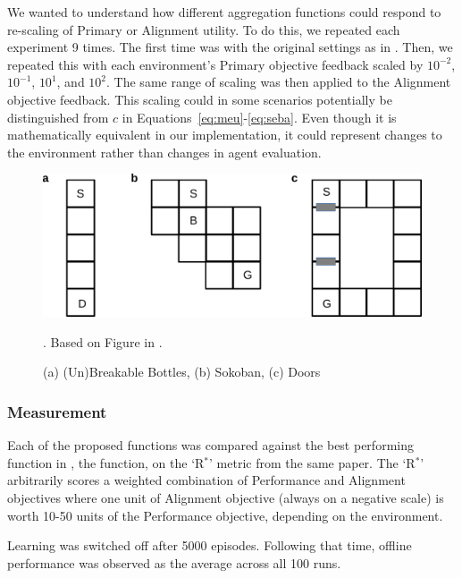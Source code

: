We wanted to understand how different aggregation functions could respond to re-scaling of Primary or Alignment utility. To do this, we repeated each experiment 9 times. The first time was with the original settings as in \cite{vamplew_potential-based_2021}. Then, we repeated this with each environment's Primary objective feedback scaled by $10^{-2}$, $10^{-1}$, $10^1$, and $10^2$. The same range of scaling was then applied to the Alignment objective feedback. This scaling could in some scenarios potentially be distinguished from $c$ in Equations~\ref{eq:meu}-\ref{eq:seba}. Even though it is mathematically equivalent in our implementation, it could represent changes to the environment rather than changes in agent evaluation.


\begin{figure}
    \centering
    \includegraphics[width=1\columnwidth]{output/env_figure.pdf}
    \caption{(a) (Un)Breakable Bottles, (b) Sokoban, (c) Doors}. Based on Figure in \cite{vamplew_potential-based_2021}.
    \label{fig:envs}
\end{figure}

\subsubsection{Measurement}

Each of the proposed functions was compared against the best performing function in \cite{vamplew_potential-based_2021}, the \tloA{} function, on the `R$^*$' metric from the same paper. The `R$^*$' arbitrarily scores a weighted combination of Performance and Alignment objectives where one unit of Alignment objective (always on a negative scale) is worth 10-50 units of the Performance objective, depending on the environment.%

Learning was switched off after 5000 episodes. Following that time, offline performance was observed as the average across all 100 runs.

